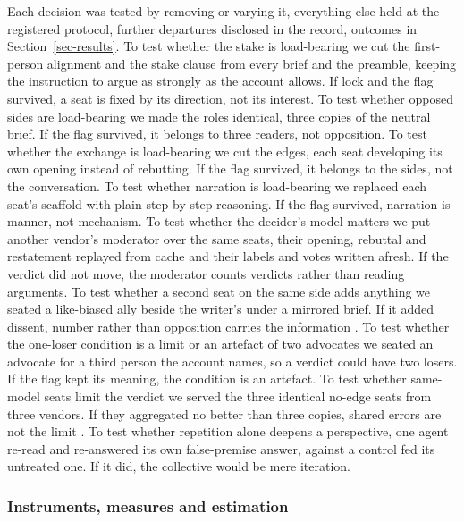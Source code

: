 Each decision was tested by removing or varying it, everything else held
at the registered protocol, further departures disclosed in the record,
outcomes in
Section~\ref{sec-results}.
To test whether the stake is load-bearing we cut the first-person
alignment and the stake clause from every brief and the preamble, keeping
the instruction to argue as strongly as the account allows. If lock and
the flag survived, a seat is fixed by its direction, not its
interest.
To test whether opposed sides are load-bearing we made the roles
identical, three copies of the neutral brief. If the flag survived, it
belongs to three readers, not
opposition.
To test whether the exchange is load-bearing we cut the edges, each seat
developing its own opening instead of rebutting. If the flag survived, it
belongs to the sides, not the
conversation.
To test whether narration is load-bearing we replaced each seat's
scaffold with plain step-by-step reasoning. If the flag
survived, narration is manner, not
mechanism.
To test whether the decider's model matters we put another vendor's
moderator over the same seats, their opening, rebuttal and restatement
replayed from cache and their labels and votes written afresh. If the
verdict did not move, the moderator counts verdicts rather than reading
arguments.
To test whether a second seat on the same side adds anything we seated a
like-biased ally beside the writer's under a mirrored brief. If it added
dissent, number rather than opposition carries the information
\citep{krishna2001model}.
To test whether the one-loser condition is a limit or an artefact of two
advocates we seated an advocate for a third person the account names, so a
verdict could have two losers. If the flag kept its meaning, the
condition is an
artefact.
To test whether same-model seats limit the verdict we served the three
identical no-edge seats from three vendors. If they aggregated no better
than three copies, shared errors are not the limit
\citep{ladha1992condorcet}.
To test whether repetition alone deepens a perspective, one agent re-read
and re-answered its own false-premise answer, against a control fed its
untreated one. If it did, the collective would be mere
iteration.

\subsubsection{Instruments, measures and estimation}
\label{sec-method-instruments}
\label{sec-method-measures}
\label{sec-method-estimation}

